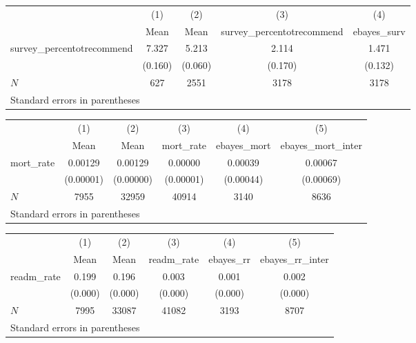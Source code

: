\begin{tabular}{l*{4}{c}}
\hline\hline
            &\multicolumn{1}{c}{(1)}&\multicolumn{1}{c}{(2)}&\multicolumn{1}{c}{(3)}&\multicolumn{1}{c}{(4)}\\
            &\multicolumn{1}{c}{Mean}&\multicolumn{1}{c}{Mean}&\multicolumn{1}{c}{survey\_percentotrecommend}&\multicolumn{1}{c}{ebayes\_surv}\\
\hline
survey\_percentotrecommend&       7.327&       5.213&       2.114&       1.471\\
            &     (0.160)&     (0.060)&     (0.170)&     (0.132)\\
\hline
\(N\)       &         627&        2551&        3178&        3178\\
\hline\hline
\multicolumn{5}{l}{\footnotesize Standard errors in parentheses}\\
\end{tabular}
\begin{tabular}{l*{5}{c}}
\hline\hline
            &\multicolumn{1}{c}{(1)}&\multicolumn{1}{c}{(2)}&\multicolumn{1}{c}{(3)}&\multicolumn{1}{c}{(4)}&\multicolumn{1}{c}{(5)}\\
            &\multicolumn{1}{c}{Mean}&\multicolumn{1}{c}{Mean}&\multicolumn{1}{c}{mort\_rate}&\multicolumn{1}{c}{ebayes\_mort}&\multicolumn{1}{c}{ebayes\_mort\_inter}\\
\hline
mort\_rate   &     0.00129&     0.00129&     0.00000&     0.00039&     0.00067\\
            &   (0.00001)&   (0.00000)&   (0.00001)&   (0.00044)&   (0.00069)\\
\hline
\(N\)       &        7955&       32959&       40914&        3140&        8636\\
\hline\hline
\multicolumn{6}{l}{\footnotesize Standard errors in parentheses}\\
\end{tabular}
\begin{tabular}{l*{5}{c}}
\hline\hline
            &\multicolumn{1}{c}{(1)}&\multicolumn{1}{c}{(2)}&\multicolumn{1}{c}{(3)}&\multicolumn{1}{c}{(4)}&\multicolumn{1}{c}{(5)}\\
            &\multicolumn{1}{c}{Mean}&\multicolumn{1}{c}{Mean}&\multicolumn{1}{c}{readm\_rate}&\multicolumn{1}{c}{ebayes\_rr}&\multicolumn{1}{c}{ebayes\_rr\_inter}\\
\hline
readm\_rate  &       0.199&       0.196&       0.003&       0.001&       0.002\\
            &     (0.000)&     (0.000)&     (0.000)&     (0.000)&     (0.000)\\
\hline
\(N\)       &        7995&       33087&       41082&        3193&        8707\\
\hline\hline
\multicolumn{6}{l}{\footnotesize Standard errors in parentheses}\\
\end{tabular}
